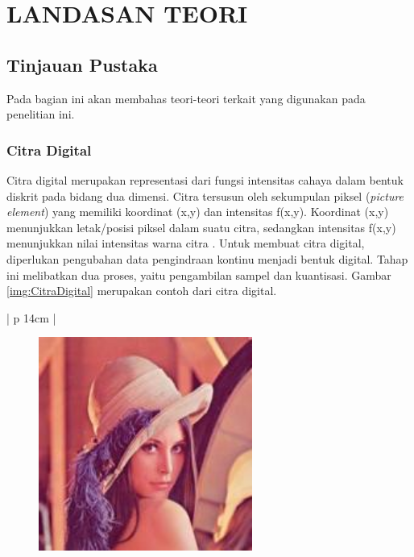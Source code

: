 \chapter{LANDASAN TEORI}

%
\vspace{4.5pt}

\section{Tinjauan Pustaka}
Pada bagian ini akan membahas teori-teori terkait yang digunakan pada penelitian ini.
\\

\subsection{Citra Digital}
Citra digital merupakan representasi dari fungsi intensitas cahaya dalam bentuk diskrit pada bidang dua dimensi. Citra tersusun oleh sekumpulan piksel (\textit{picture element}) yang memiliki koordinat (x,y) dan intensitas f(x,y). Koordinat (x,y) menunjukkan letak/posisi piksel dalam suatu citra, sedangkan intensitas f(x,y) menunjukkan nilai intensitas warna citra \cite{gonzalez}. Untuk membuat citra digital, diperlukan pengubahan data pengindraan kontinu menjadi bentuk digital. Tahap ini melibatkan dua proses, yaitu pengambilan sampel dan kuantisasi. Gambar \ref{img:CitraDigital} merupakan contoh dari citra digital.

\begin{table}[H]
	\small
	\begin{adjustbox}{width=1\textwidth}
		\begin{tabular}{| p {14cm} |}
			\hline
			\begin{figure}[H]
				\centering
				\includegraphics[width=7cm]{images/rgb.jpg}
			\end{figure} \\
			\hline
		\end{tabular}
	\end{adjustbox}
	\label{img:CitraDigital}
\end{table}

